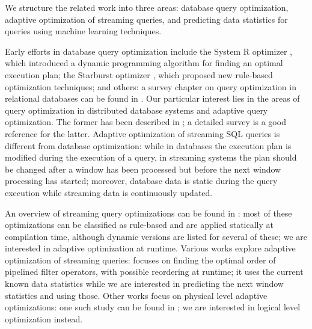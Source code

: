 \label {sec:fs-optimization-related-work}

We structure the related work into three areas: database query optimization, adaptive optimization of streaming queries, and predicting data statistics for queries using machine learning techniques.

Early efforts in database query optimization include the System R optimizer \cite{selinger1979access}, which introduced a dynamic programming algorithm for finding an optimal execution plan; the Starburst optimizer \cite{haas1989extensible}, which proposed new rule-based optimization techniques; and others: a survey chapter on query optimization in relational databases can be found in \cite{Neumann2018optimization}. Our particular interest lies in the areas of query optimization in distributed database systems and adaptive query optimization. The former has been described in \cite{kossmann2000thestate}; a detailed survey \cite{deshpande2007adaptive} is a good reference for the latter. Adaptive optimization of streaming SQL queries is different from database optimization: while in databases the execution plan is modified during the execution of a query, in streaming systems the plan should be changed after a window has been processed but before the next window processing has started; moreover, database data is static during the query execution while streaming data is continuously updated.

An overview of streaming query optimizations can be found in \cite{hirzel2014catalog}: most of these optimizations can be classified as rule-based and are applied statically at compilation time, although dynamic versions are listed for several of these; we are interested in adaptive optimization at runtime. Various works explore adaptive optimization of streaming queries: \cite{babu2004adaptive} focuses on finding the optimal order of pipelined filter operators, with possible reordering at runtime; it uses the current known data statistics while we are interested in predicting the next window statistics and using those. Other works focus on physical level adaptive optimizations: one such study can be found in \cite{grulich2020grizzly}; we are interested in logical level optimization instead.

